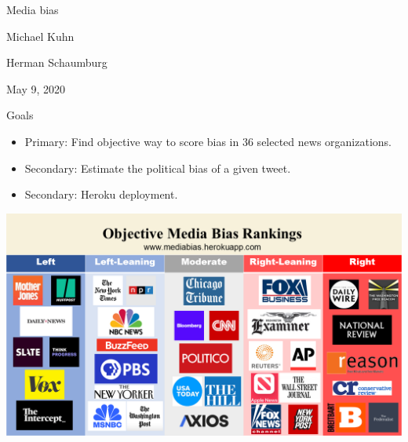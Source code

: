 \documentclass[12pt]{article}
\theoremstyle{example}
\theoremstyle{defn}
\begin{document}
\pagestyle{fancy}
\setlength{\parindent}{0pt}
\setlength{\parskip}{12pt}
\setlength{\columnsep}{0.4in}
\thispagestyle{empty} %
\pagecolor{background}
\setcounter{page}{0}

\vspace*{\fill}




\setcounter{section}{14}
\setcounter{subsection}{3}

\setcounter{example}{0}

\vspace*{\fill}

\begin{center}
\begin{spacing}{1.5}
\begin{Large}
Media bias
\end{Large}
\end{spacing}


\vspace*{12pt}
{Michael Kuhn

Herman Schaumburg

May 9, 2020}


\end{center}

\vspace*{\fill}

\clearpage


{Goals}

\vspace*{-16pt}
\begin{footnotesize}
\begin{itemize}[\label{}]
\item Primary: Find objective way to score bias in 36 selected news organizations.
\item Secondary: Estimate the political bias of a given tweet.
\item Secondary: Heroku deployment.
\end{itemize}
\end{footnotesize}

\clearpage

\vfill

\hspace*{\fill}
\includegraphics[scale=0.3]{mediabiaschart.png}
\hspace*{\fill}
\end{document}
